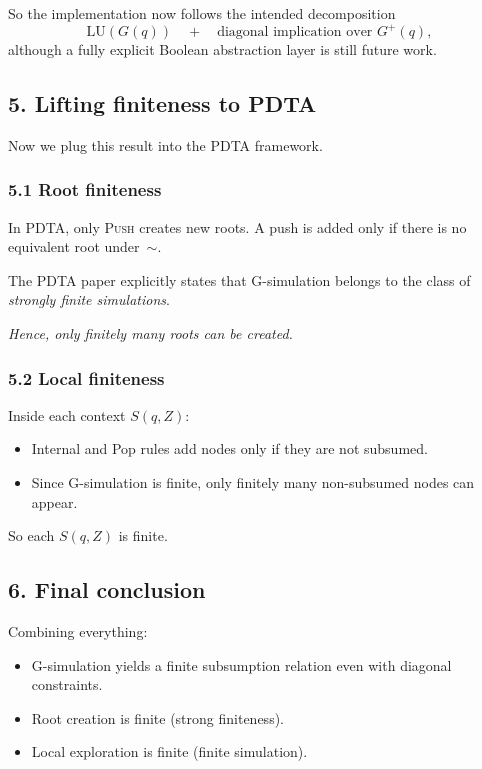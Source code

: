 \documentclass{article}
\begin{document}
So the implementation now follows the intended decomposition
\[
\text{LU}(G(q)) \quad + \quad \text{diagonal implication over } G^+(q),
\]
although a fully explicit Boolean abstraction layer is still future work.


\subsection*{5. Lifting finiteness to PDTA}

Now we plug this result into the PDTA framework.

\subsubsection*{5.1 Root finiteness}

In PDTA, only \textsc{Push} creates new roots.
A push is added only if there is no equivalent root under~$\sim$.

The PDTA paper explicitly states that G-simulation belongs to the class of
\emph{strongly finite simulations}.

\medskip
\noindent
\emph{Hence, only finitely many roots can be created.}


\subsubsection*{5.2 Local finiteness}

Inside each context $S(q,Z)$:
\begin{itemize}
  \item Internal and Pop rules add nodes only if they are
        not subsumed.
  \item Since G-simulation is finite, only finitely many
        non-subsumed nodes can appear.
\end{itemize}

So each $S(q,Z)$ is finite.


\subsection*{6. Final conclusion}

Combining everything:

\begin{itemize}
  \item G-simulation yields a finite subsumption relation
        even with diagonal constraints.
  \item Root creation is finite (strong finiteness).
  \item Local exploration is finite (finite simulation).
\end{itemize}
\end{document}
